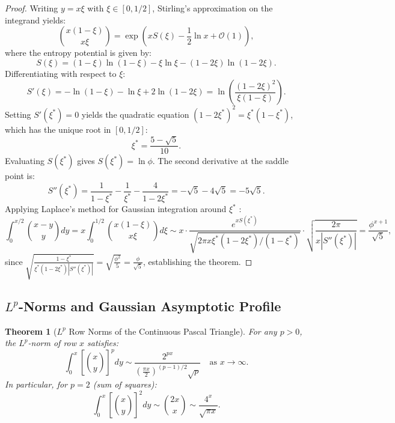 \documentclass[11pt,a4paper]{article}
\theoremstyle{plain}
\newtheorem{theorem}{Theorem}[section]
\theoremstyle{definition}
\theoremstyle{remark}
\numberwithin{equation}{section}
\begin{document}
\begin{proof}
Writing $y = x\xi$ with $\xi \in [0, 1/2]$, Stirling's approximation on the integrand yields:
\begin{equation}
\binom{x(1-\xi)}{x\xi} = \exp\left(x S(\xi) - \frac{1}{2}\ln x + \mathcal{O}(1)\right),
\end{equation}
where the entropy potential is given by:
\begin{equation}
S(\xi) = (1-\xi)\ln(1-\xi) - \xi\ln\xi - (1-2\xi)\ln(1-2\xi).
\end{equation}
Differentiating with respect to $\xi$:
\begin{equation}
S'(\xi) = -\ln(1-\xi) - \ln\xi + 2\ln(1-2\xi) = \ln\left(\frac{(1-2\xi)^2}{\xi(1-\xi)}\right).
\end{equation}
Setting $S'(\xi^*) = 0$ yields the quadratic equation $(1-2\xi^*)^2 = \xi^*(1-\xi^*)$, which has the unique root in $[0, 1/2]$:
\begin{equation}
\xi^* = \frac{5 - \sqrt{5}}{10}.
\end{equation}
Evaluating $S(\xi^*)$ gives $S(\xi^*) = \ln\phi$. The second derivative at the saddle point is:
\begin{equation}
S''(\xi^*) = \frac{1}{1-\xi^*} - \frac{1}{\xi^*} - \frac{4}{1-2\xi^*} = -\sqrt{5} - 4\sqrt{5} = -5\sqrt{5}.
\end{equation}
Applying Laplace's method for Gaussian integration around $\xi^*$ \cite{olver1997, wong2001}:
\begin{equation}
\int_0^{x/2} \binom{x-y}{y}dy = x \int_0^{1/2} \binom{x(1-\xi)}{x\xi}d\xi \sim x \cdot \frac{e^{x S(\xi^*)}}{\sqrt{2\pi x \xi^*(1-2\xi^*)/(1-\xi^*)}} \cdot \sqrt{\frac{2\pi}{x |S''(\xi^*)|}} = \frac{\phi^{x+1}}{\sqrt{5}},
\end{equation}
since $\sqrt{\frac{1-\xi^*}{\xi^*(1-2\xi^*) |S''(\xi^*)|}} = \sqrt{\frac{\phi^2}{5}} = \frac{\phi}{\sqrt{5}}$, establishing the theorem.
\end{proof}

\subsection{\texorpdfstring{$L^p$}{Lp}-Norms and Gaussian Asymptotic Profile}

\begin{theorem}[$L^p$ Row Norms of the Continuous Pascal Triangle]
For any $p > 0$, the $L^p$-norm of row $x$ satisfies:
\begin{equation}
\int_0^x \left[\binom{x}{y}\right]^p dy \sim \frac{2^{px}}{\left(\frac{\pi x}{2}\right)^{(p-1)/2}\sqrt{p}} \quad \text{as } x \to \infty.
\end{equation}
In particular, for $p=2$ (sum of squares):
\begin{equation}
\int_0^x \left[\binom{x}{y}\right]^2 dy \sim \binom{2x}{x} \sim \frac{4^x}{\sqrt{\pi x}}.
\end{equation}
\end{theorem}
\end{document}
